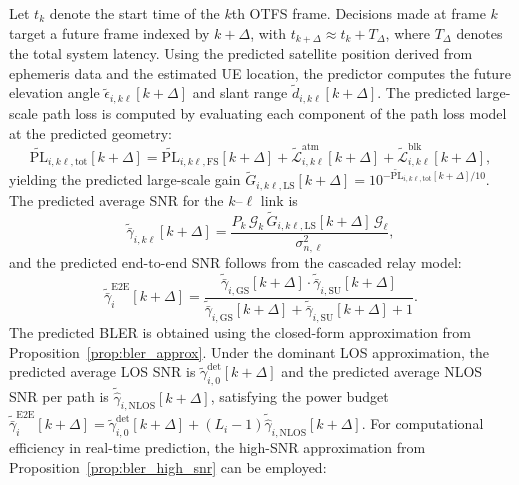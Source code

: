 \documentclass[lettersize,journal]{IEEEtran}
\begin{document}
Let $t_k$ denote the start time of the $k$th OTFS frame. Decisions made at frame $k$ target a future frame indexed by $k + \Delta$, with $t_{k+\Delta} \approx t_k + T_{\Delta}$, where $T_{\Delta}$ denotes the total system latency. Using the predicted satellite position derived from ephemeris data and  the estimated UE location, the predictor computes the future elevation  angle $\tilde{\epsilon}_{i,k\ell}[k+\Delta]$ and slant range $\tilde{d}_{i,k\ell}[k+\Delta]$. The predicted large-scale path loss is computed by evaluating each component of the path loss model at the predicted geometry:
\begin{equation}
\widetilde{\mathrm{PL}}_{i,k\ell,\mathrm{tot}}[k+\Delta] = \widetilde{\mathrm{PL}}_{i,k\ell,\mathrm{FS}}[k+\Delta] + \tilde{\mathcal{L}}_{i,k\ell}^{\mathrm{atm}}[k+\Delta] + \tilde{\mathcal{L}}_{i,k\ell}^{\mathrm{blk}}[k+\Delta],
\label{eq:predicted_path_loss}
\end{equation}
yielding the predicted large-scale gain $\tilde{G}_{i,k\ell,\mathrm{LS}}[k+\Delta] = 10^{-\widetilde{\mathrm{PL}}_{i,k\ell,\mathrm{tot}}[k+\Delta]/10}$. The predicted average SNR for the $k$--$\ell$ link is
\begin{equation}
\tilde{\bar{\gamma}}_{i,k\ell}[k+\Delta] = \frac{P_k\, \mathcal{G}_k\, \tilde{G}_{i,k\ell,\mathrm{LS}}[k+\Delta]\, \mathcal{G}_\ell}{\sigma_{n,\ell}^2},
\label{eq:predicted_avg_snr}
\end{equation}
and the predicted end-to-end SNR follows from the cascaded relay model:
\begin{equation}
\tilde{\bar{\gamma}}_{i}^{\mathrm{E2E}}[k+\Delta] = \frac{\tilde{\bar{\gamma}}_{i,\mathrm{GS}}[k+\Delta] \cdot \tilde{\bar{\gamma}}_{i,\mathrm{SU}}[k+\Delta]}{\tilde{\bar{\gamma}}_{i,\mathrm{GS}}[k+\Delta] + \tilde{\bar{\gamma}}_{i,\mathrm{SU}}[k+\Delta] + 1}.
\label{eq:predicted_cascaded_snr}
\end{equation} The predicted BLER is obtained using the closed-form approximation from Proposition~\ref{prop:bler_approx}. Under the dominant LOS approximation, the predicted average LOS SNR is $\tilde{\gamma}_{i,0}^{\mathrm{det}}[k+\Delta]$ and the predicted average NLOS SNR per path is $\tilde{\hat{\gamma}}_{i,\mathrm{NLOS}}[k+\Delta]$, satisfying the power budget $\tilde{\bar{\gamma}}_{i}^{\mathrm{E2E}}[k+\Delta] = \tilde{\gamma}_{i,0}^{\mathrm{det}}[k+\Delta] + (L_i-1)\tilde{\hat{\gamma}}_{i,\mathrm{NLOS}}[k+\Delta]$. For computational efficiency in real-time prediction, the high-SNR approximation from Proposition~\ref{prop:bler_high_snr} can be employed:
\end{document}
